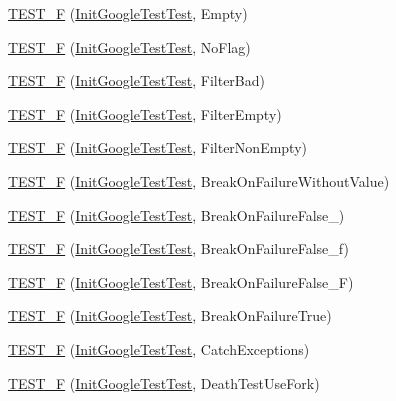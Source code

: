\begin{DoxyCompactItemize}
\item 
\hyperlink{namespacetesting_ae80ccfaa178730f49af649cd044e84e4}{T\+E\+S\+T\+\_\+F} (\hyperlink{classtesting_1_1_init_google_test_test}{Init\+Google\+Test\+Test}, Empty)
\item 
\hyperlink{namespacetesting_add96563b5ca11c20fe2766a848c2bb63}{T\+E\+S\+T\+\_\+F} (\hyperlink{classtesting_1_1_init_google_test_test}{Init\+Google\+Test\+Test}, No\+Flag)
\item 
\hyperlink{namespacetesting_ab368a135e5a7a59bceb912a5f636004a}{T\+E\+S\+T\+\_\+F} (\hyperlink{classtesting_1_1_init_google_test_test}{Init\+Google\+Test\+Test}, Filter\+Bad)
\item 
\hyperlink{namespacetesting_a04d011d2e5695513c45216ae1b98095b}{T\+E\+S\+T\+\_\+F} (\hyperlink{classtesting_1_1_init_google_test_test}{Init\+Google\+Test\+Test}, Filter\+Empty)
\item 
\hyperlink{namespacetesting_a69dcb047e8cf4f93e8132faf11ba7110}{T\+E\+S\+T\+\_\+F} (\hyperlink{classtesting_1_1_init_google_test_test}{Init\+Google\+Test\+Test}, Filter\+Non\+Empty)
\item 
\hyperlink{namespacetesting_afc3e46c96f27aa2b502b15e8e4bab2ca}{T\+E\+S\+T\+\_\+F} (\hyperlink{classtesting_1_1_init_google_test_test}{Init\+Google\+Test\+Test}, Break\+On\+Failure\+Without\+Value)
\item 
\hyperlink{namespacetesting_abd2b3ac615374fbe560ba35be4c4e928}{T\+E\+S\+T\+\_\+F} (\hyperlink{classtesting_1_1_init_google_test_test}{Init\+Google\+Test\+Test}, Break\+On\+Failure\+False\+\_)
\item 
\hyperlink{namespacetesting_abb038e044a4f2142414624e482b48eeb}{T\+E\+S\+T\+\_\+F} (\hyperlink{classtesting_1_1_init_google_test_test}{Init\+Google\+Test\+Test}, Break\+On\+Failure\+False\+\_\+f)
\item 
\hyperlink{namespacetesting_aec19373865e49dbd1fe7f22c8db4a256}{T\+E\+S\+T\+\_\+F} (\hyperlink{classtesting_1_1_init_google_test_test}{Init\+Google\+Test\+Test}, Break\+On\+Failure\+False\+\_\+F)
\item 
\hyperlink{namespacetesting_aaf881d7ee8cfa238e9a66d0562937fde}{T\+E\+S\+T\+\_\+F} (\hyperlink{classtesting_1_1_init_google_test_test}{Init\+Google\+Test\+Test}, Break\+On\+Failure\+True)
\item 
\hyperlink{namespacetesting_af59442310531cd96d8aa3ce5acb2d025}{T\+E\+S\+T\+\_\+F} (\hyperlink{classtesting_1_1_init_google_test_test}{Init\+Google\+Test\+Test}, Catch\+Exceptions)
\item 
\hyperlink{namespacetesting_aa5259681257cd3654f34dc81212c82bc}{T\+E\+S\+T\+\_\+F} (\hyperlink{classtesting_1_1_init_google_test_test}{Init\+Google\+Test\+Test}, Death\+Test\+Use\+Fork)

\end{DoxyCompactItemize}
